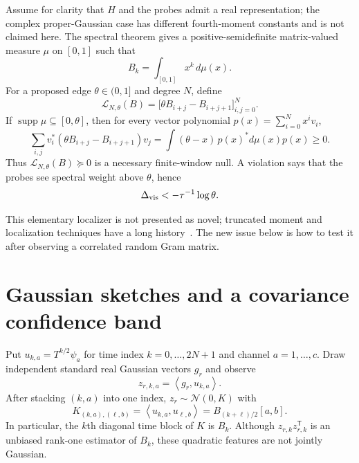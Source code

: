 \documentclass[11pt]{article}
\newcommand{\ip}[2]{\left\langle #1,#2\right\rangle}
\begin{document}
Assume for clarity that $H$ and the probes admit a real representation; the
complex proper-Gaussian case has different fourth-moment constants and is not
claimed here.  The spectral theorem gives a positive-semidefinite matrix-valued
measure $\mu$ on $[0,1]$ such that
\begin{equation}
  B_k=\int_{[0,1]}x^k\,d\mu(x).
\end{equation}
For a proposed edge $\theta\in(0,1]$ and degree $N$, define
\begin{equation}
  \mathcal L_{N,\theta}(B)
  =\big[\theta B_{i+j}-B_{i+j+1}\big]_{i,j=0}^{N}.
  \label{eq:localizer}
\end{equation}
If $\operatorname{supp}\mu\subseteq[0,\theta]$, then for every vector
polynomial $p(x)=\sum_{i=0}^N x^iv_i$,
\begin{equation}
  \sum_{i,j}v_i^*(\theta B_{i+j}-B_{i+j+1})v_j
  =\int(\theta-x)\,p(x)^*d\mu(x)p(x)\ge0.
\end{equation}
Thus $\mathcal L_{N,\theta}(B)\succeq0$ is a necessary finite-window null.
A violation says that the probes see spectral weight above $\theta$, hence
\begin{equation}
  \Delta_{\rm vis}< -\tau^{-1}\log\theta.
\end{equation}

This elementary localizer is not presented as novel; truncated moment and
localization techniques have a long history~\cite{HeltonNie2011,deKlerk2018}.
The new issue below is how to test it after observing a correlated random Gram
matrix.

\section{Gaussian sketches and a covariance confidence band}

Put $u_{k,a}=T^{k/2}\psi_a$ for time index $k=0,\ldots,2N+1$ and channel
$a=1,\ldots,c$.  Draw independent standard real Gaussian vectors $g_r$ and
observe
\begin{equation}
  z_{r,k,a}=\ip{g_r}{u_{k,a}}.
  \label{eq:sketch}
\end{equation}
After stacking $(k,a)$ into one index, $z_r\sim\mathcal N(0,K)$ with
\begin{equation}
  K_{(k,a),(\ell,b)}
   =\ip{u_{k,a}}{u_{\ell,b}}
   = B_{(k+\ell)/2}[a,b].
  \label{eq:jointgram}
\end{equation}
In particular, the $k$th diagonal time block of $K$ is $B_k$.  Although
$z_{r,k}z_{r,k}^{\mathsf T}$ is an unbiased rank-one estimator of $B_k$, these
quadratic features are not jointly Gaussian.
\end{document}
